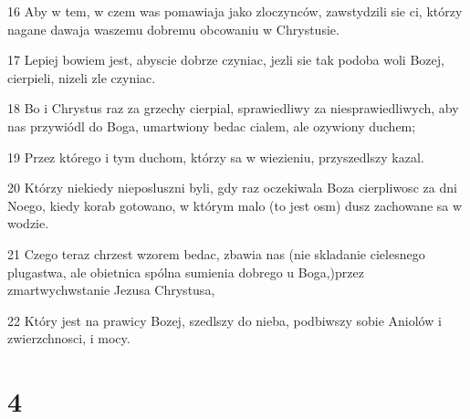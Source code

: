 \par 16 Aby w tem, w czem was pomawiaja jako zloczynców, zawstydzili sie ci, którzy nagane dawaja waszemu dobremu obcowaniu w Chrystusie.
\par 17 Lepiej bowiem jest, abyscie dobrze czyniac, jezli sie tak podoba woli Bozej, cierpieli, nizeli zle czyniac.
\par 18 Bo i Chrystus raz za grzechy cierpial, sprawiedliwy za niesprawiedliwych, aby nas przywiódl do Boga, umartwiony bedac cialem, ale ozywiony duchem;
\par 19 Przez którego i tym duchom, którzy sa w wiezieniu, przyszedlszy kazal.
\par 20 Którzy niekiedy nieposluszni byli, gdy raz oczekiwala Boza cierpliwosc za dni Noego, kiedy korab gotowano, w którym malo (to jest osm) dusz zachowane sa w wodzie.
\par 21 Czego teraz chrzest wzorem bedac, zbawia nas (nie skladanie cielesnego plugastwa, ale obietnica spólna sumienia dobrego u Boga,)przez zmartwychwstanie Jezusa Chrystusa,
\par 22 Który jest na prawicy Bozej, szedlszy do nieba, podbiwszy sobie Aniolów i zwierzchnosci, i mocy.

\chapter{4}

